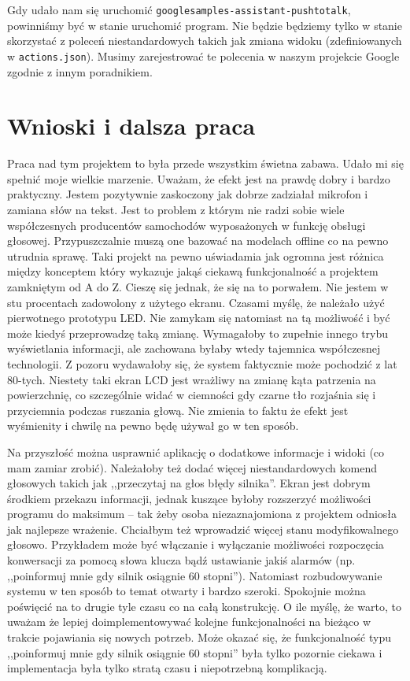 \documentclass[declaration,shortabstract, inz]{iithesis}
\begin{document}
    Gdy udało nam się uruchomić \texttt{googlesamples-assistant-pushtotalk}, powinniśmy być w stanie uruchomić program. Nie będzie będziemy tylko w stanie skorzystać z poleceń niestandardowych takich jak zmiana widoku (zdefiniowanych w \texttt{actions.json}). Musimy zarejestrować te polecenia w naszym projekcie Google zgodnie z innym poradnikiem\cite{actions}.


\chapter{Wnioski i dalsza praca}
    Praca nad tym projektem to była przede wszystkim świetna zabawa. Udało mi się spełnić moje wielkie marzenie. Uważam, że efekt jest na prawdę dobry i bardzo praktyczny. Jestem pozytywnie zaskoczony jak dobrze zadziałał mikrofon i zamiana słów na tekst. Jest to problem z którym nie radzi sobie wiele współczesnych producentów samochodów wyposażonych w funkcję obsługi głosowej. Przypuszczalnie muszą one bazować na modelach offline co na pewno utrudnia sprawę. Taki projekt na pewno uświadamia jak ogromna jest różnica między konceptem który wykazuje jakąś ciekawą funkcjonalność a projektem zamkniętym od A do Z. Cieszę się jednak, że się na to porwałem. Nie jestem w stu procentach zadowolony z użytego ekranu. Czasami myślę, że należało użyć pierwotnego prototypu LED. Nie zamykam się natomiast na tą możliwość i być może kiedyś przeprowadzę taką zmianę. Wymagałoby to zupełnie innego trybu wyświetlania informacji, ale zachowana byłaby wtedy tajemnica współczesnej technologii. Z pozoru wydawałoby się, że system faktycznie może pochodzić z lat 80-tych. Niestety taki ekran LCD jest wrażliwy na zmianę kąta patrzenia na powierzchnię, co szczególnie widać w ciemności gdy czarne tło rozjaśnia się i przyciemnia podczas ruszania głową. Nie zmienia to faktu że efekt jest wyśmienity i chwilę na pewno będę używał go w ten sposób.
    
    Na przyszłość można usprawnić aplikację o dodatkowe informacje i widoki (co mam zamiar zrobić). Należałoby też dodać więcej niestandardowych komend głosowych takich jak ,,przeczytaj na głos błędy silnika''. Ekran jest dobrym środkiem przekazu informacji, jednak kuszące byłoby rozszerzyć możliwości programu do maksimum -- tak żeby osoba niezaznajomiona z projektem odniosła jak najlepsze wrażenie. Chciałbym też wprowadzić więcej stanu modyfikowalnego głosowo. Przykładem może być włączanie i wyłączanie możliwości rozpoczęcia konwersacji za pomocą słowa klucza bądź ustawianie jakiś alarmów (np. ,,poinformuj mnie gdy silnik osiągnie 60 stopni''). Natomiast rozbudowywanie systemu w ten sposób to temat otwarty i bardzo szeroki. Spokojnie można poświęcić na to drugie tyle czasu co na całą konstrukcję. O ile myślę, że warto, to uważam że lepiej doimplementowywać kolejne funkcjonalności na bieżąco w trakcie pojawiania się nowych potrzeb. Może okazać się, że funkcjonalność typu ,,poinformuj mnie gdy silnik osiągnie 60 stopni'' była tylko pozornie ciekawa i implementacja była tylko stratą czasu i niepotrzebną komplikacją.
    
\end{document}
